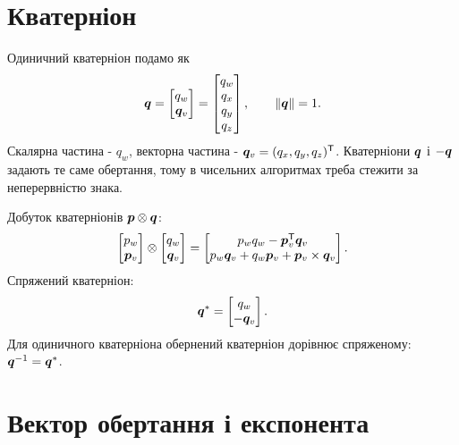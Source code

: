 \section{Кватерніон}

Одиничний кватерніон подамо як
\begin{equation}
    \bm{q}=\begin{bmatrix}q_w\\\bm{q}_v\end{bmatrix}
    =\begin{bmatrix}q_w\\q_x\\q_y\\q_z\end{bmatrix},
    \qquad
    \|\bm{q}\|=1.
\end{equation}
Скалярна частина - $q_w$, векторна частина - $\bm{q}_v=(q_x,q_y,q_z)^{\mathsf{T}}$. Кватерніони $\bm{q}$ і $-\bm{q}$ задають те саме обертання, тому в чисельних алгоритмах треба стежити за неперервністю знака.

Добуток кватерніонів $\bm{p}\otimes\bm{q}$:
\begin{equation}
\begin{bmatrix}p_w\\\bm{p}_v\end{bmatrix}
\otimes
\begin{bmatrix}q_w\\\bm{q}_v\end{bmatrix}
=
\begin{bmatrix}
    p_wq_w-\bm{p}_v^{\mathsf{T}}\bm{q}_v\\
    p_w\bm{q}_v+q_w\bm{p}_v+\bm{p}_v\times\bm{q}_v
\end{bmatrix}.
\end{equation}
Спряжений кватерніон:
\begin{equation}
    \bm{q}^{*}=\begin{bmatrix}q_w\\-\bm{q}_v\end{bmatrix}.
\end{equation}
Для одиничного кватерніона обернений кватерніон дорівнює спряженому: $\bm{q}^{-1}=\bm{q}^{*}$.

\section{Вектор обертання і експонента}

